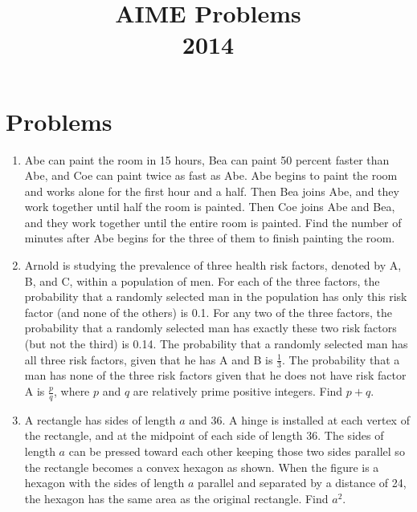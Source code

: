 \documentclass{article}
\title{AIME Problems \\ 2014}
\date{}
\begin{document}
\maketitle\thispagestyle{fancy}\newpage\section*{Problems}\begin{enumerate}[label=\arabic*., itemsep=0.5em]\item Abe can paint the room in 15 hours, Bea can paint 50 percent faster than Abe, and Coe can paint twice as fast as Abe. Abe begins to paint the room and works alone for the first hour and a half. Then Bea joins Abe, and they work together until half the room is painted. Then Coe joins Abe and Bea, and they work together until the entire room is painted. Find the number of minutes after Abe begins for the three of them to finish painting the room.\par \vspace{0.5em}\item Arnold is studying the prevalence of three health risk factors, denoted by A, B, and C, within a population of men. For each of the three factors, the probability that a randomly selected man in the population has only this risk factor (and none of the others) is 0.1. For any two of the three factors, the probability that a randomly selected man has exactly these two risk factors (but not the third) is 0.14. The probability that a randomly selected man has all three risk factors, given that he has A and B is $\frac{1}{3}$. The probability that a man has none of the three risk factors given that he does not have risk factor A is $\frac{p}{q}$, where $p$ and $q$ are relatively prime positive integers. Find $p+q$.\par \vspace{0.5em}\item A rectangle has sides of length $a$ and 36. A hinge is installed at each vertex of the rectangle, and at the midpoint of each side of length 36. The sides of length $a$ can be pressed toward each other keeping those two sides parallel so the rectangle becomes a convex hexagon as shown. When the figure is a hexagon with the sides of length $a$ parallel and separated by a distance of 24, the hexagon has the same area as the original rectangle. Find $a^2$. 




\end{enumerate}
\end{document}
